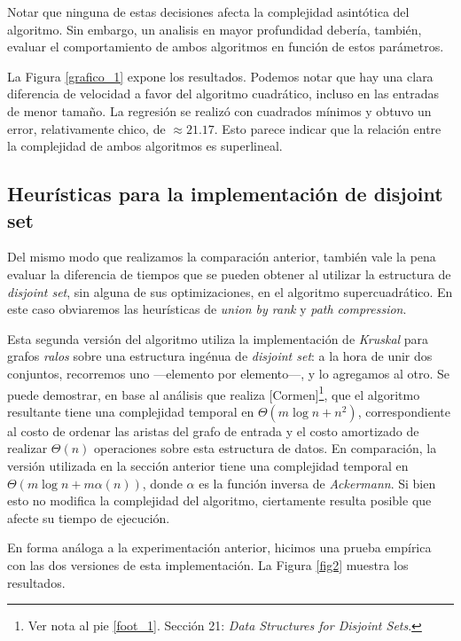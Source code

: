 Notar que ninguna de estas decisiones afecta la complejidad asintótica del algoritmo. Sin embargo, un analisis en mayor profundidad debería, también, evaluar el comportamiento de ambos algoritmos en función de estos parámetros.

La Figura \ref{grafico_1} expone los resultados. Podemos notar que hay una clara diferencia de velocidad a favor del algoritmo cuadrático, incluso en las entradas de menor tamaño. La regresión se realizó con cuadrados mínimos y obtuvo un error, relativamente chico, de $\approx 21.17$. Esto parece indicar que la relación entre la complejidad de ambos algoritmos es superlineal. %

\subsection{Heurísticas para la implementación de disjoint set}

Del mismo modo que realizamos la comparación anterior, también vale la pena evaluar la diferencia de tiempos que se pueden obtener al utilizar la estructura de \textit{disjoint set}, sin alguna de sus optimizaciones, en el algoritmo supercuadrático. En este caso obviaremos las heurísticas de \textit{union by rank} y \textit{path compression}. 

Esta segunda versión del algoritmo utiliza la implementación de \textit{Kruskal} para grafos \textit{ralos} sobre una estructura ingénua de \textit{disjoint set}: a la hora de unir dos conjuntos, recorremos uno ---elemento por elemento---, y lo agregamos al otro. Se puede demostrar, en base al análisis que realiza [Cormen]\footnote{Ver nota al pie \ref{foot_1}. Sección 21: \textit{Data Structures for Disjoint Sets}.}, que el algoritmo resultante tiene una complejidad temporal en $\Theta(m\log n + n^2)$, correspondiente al costo de ordenar las aristas del grafo de entrada y el costo amortizado de realizar $\Theta(n)$ operaciones sobre esta estructura de datos. En comparación, la versión utilizada en la sección anterior tiene una complejidad temporal en $\Theta(m\log n + m\alpha(n))$, donde $\alpha$ es la función inversa de \textit{Ackermann}. Si bien esto no modifica la complejidad del algoritmo, ciertamente resulta posible que afecte su tiempo de ejecución.

En forma análoga a la experimentación anterior, hicimos una prueba empírica con las dos versiones de esta implementación. La Figura \ref{fig2} muestra los resultados.

